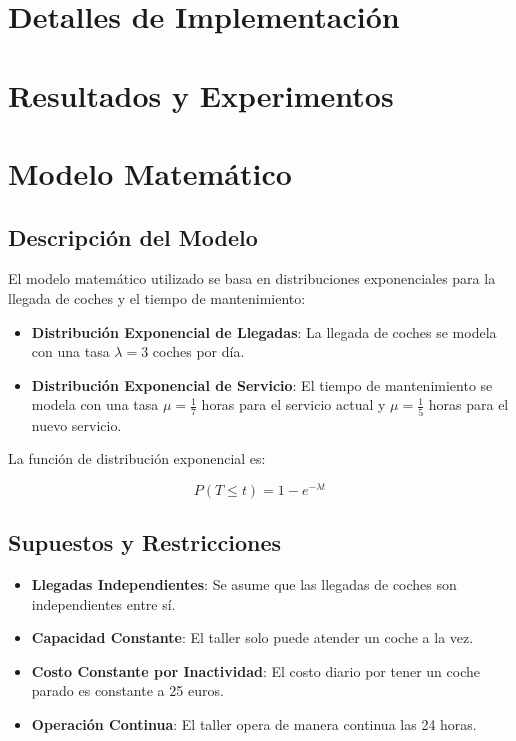 \documentclass[a4paper,12pt]{article}
\begin{document}
    \section{Detalles de Implementación}\label{sec:detalles-de-implementacion}
    


    \section{Resultados y Experimentos}\label{sec:resultados-y-experimentos}
    


    \section{Modelo Matemático}\label{sec:modelo-matematico}

    \subsection{Descripción del Modelo}\label{subsec:descripcion-del-modelo}

    El modelo matemático utilizado se basa en distribuciones exponenciales para la llegada de coches y el tiempo de mantenimiento:

    \begin{itemize}
        \item \textbf{Distribución Exponencial de Llegadas}: La llegada de coches se modela con una tasa $\lambda = 3$ coches por día.
        \item \textbf{Distribución Exponencial de Servicio}: El tiempo de mantenimiento se modela con una tasa $\mu = \frac{1}{7}$ horas para el servicio actual y $\mu = \frac{1}{5}$ horas para el nuevo servicio.
    \end{itemize}

    La función de distribución exponencial es:

    \[
        P(T \leq t) = 1 - e^{-\lambda t}
    \]

    \subsection{Supuestos y Restricciones}\label{subsec:supuestos-y-restricciones}

    \begin{itemize}
        \item \textbf{Llegadas Independientes}: Se asume que las llegadas de coches son independientes entre sí.
        \item \textbf{Capacidad Constante}: El taller solo puede atender un coche a la vez.
        \item \textbf{Costo Constante por Inactividad}: El costo diario por tener un coche parado es constante a 25 euros.
        \item \textbf{Operación Continua}: El taller opera de manera continua las 24 horas.
    \end{itemize}
\end{document}

